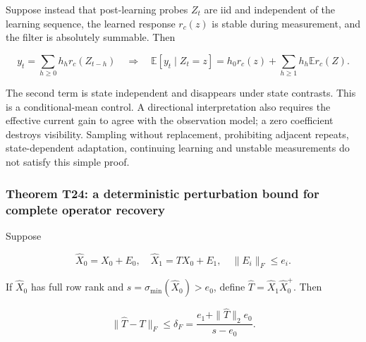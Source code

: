 \documentclass[11pt,a4paper]{article}
\begin{document}
\par
\noindent\begin{minipage}{\linewidth}

Suppose instead that post-learning probes \(Z_t\) are iid and
independent of the learning sequence, the learned response \(r_c(z)\) is
stable during measurement, and the filter is absolutely summable. Then

\[
y_t=\sum_{h\ge0}h_h r_c(Z_{t-h})
\quad\Longrightarrow\quad
\mathbb E[y_t\mid Z_t=z]
=h_0r_c(z)+\sum_{h\ge1}h_h\mathbb E r_c(Z).
\]

\end{minipage}\par

The second term is state independent and disappears under state
contrasts. This is a conditional-mean control. A directional
interpretation also requires the effective current gain to agree with
the observation model; a zero coefficient destroys visibility. Sampling
without replacement, prohibiting adjacent repeats, state-dependent
adaptation, continuing learning and unstable measurements do not satisfy
this simple proof.

\subsubsection{Theorem T24: a deterministic perturbation bound for
complete operator
recovery}\label{theorem-t24-a-deterministic-perturbation-bound-for-complete-operator-recovery}

\par
\noindent\begin{minipage}{\linewidth}

Suppose

\[
\widehat X_0=X_0+E_0,\quad
\widehat X_1=TX_0+E_1,\quad
\|E_i\|_F\le e_i.
\]

\end{minipage}\par

\par
\noindent\begin{minipage}{\linewidth}

If \(\widehat X_0\) has full row rank and
\(s=\sigma_{\min}(\widehat X_0)>e_0\), define
\(\widehat T=\widehat X_1\widehat X_0^+\). Then

\[
\|\widehat T-T\|_F\le
\delta_F=\frac{e_1+\|\widehat T\|_2e_0}{s-e_0}.
\]

\end{minipage}\par
\end{document}
